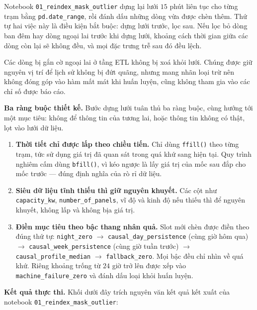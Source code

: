 \documentclass[12pt, a4paper]{report}
\begin{document}
Notebook \texttt{01\_reindex\_mask\_outlier} dựng lại lưới $15$ phút liên tục cho từng trạm
bằng \texttt{pd.date\_range}, rồi đánh dấu những dòng vừa được chèn thêm. Thứ tự hai
việc này là điều kiện bắt buộc: dựng lưới trước, lọc sau. Nếu lọc bỏ dòng ban
đêm hay dòng ngoại lai trước khi dựng lưới, khoảng cách thời gian giữa các dòng còn lại
sẽ không đều, và mọi đặc trưng trễ sau đó đều lệch.

Các dòng bị gắn cờ ngoại lai ở tầng ETL không bị xoá khỏi lưới. Chúng được giữ nguyên
vị trí để lịch sử không bị đứt quãng, nhưng mang nhãn loại trừ nên không đóng góp vào
hàm mất mát khi huấn luyện, cũng không tham gia vào các chỉ số được báo cáo.

\textbf{Ba ràng buộc thiết kế.} Bước dựng lưới tuân thủ ba ràng buộc, cùng hướng tới một
mục tiêu: không để thông tin của tương lai, hoặc thông tin không có thật, lọt vào lưới dữ liệu.

\begin{enumerate}
    \item \textbf{Thời tiết chỉ được lấp theo chiều tiến.} Chỉ dùng \texttt{ffill()} theo
    từng trạm, tức sử dụng giá trị đã quan sát trong quá khứ sang hiện tại. Quy trình nghiêm cấm
    dùng \texttt{bfill()}, vì kéo ngược là lấy giá trị của mốc sau đắp cho mốc trước --- đúng
    định nghĩa của rò rỉ dữ liệu.
    \item \textbf{Siêu dữ liệu tĩnh thiếu thì giữ nguyên khuyết.} Các cột như
    \texttt{capacity\_kw}, \texttt{number\_of\_panels}, vĩ độ và kinh độ nếu thiếu thì để nguyên
    khuyết, không lấp và không bịa giá trị.
    \item \textbf{Điền mục tiêu theo bậc thang nhân quả.} Slot mới chèn được điền theo đúng
    thứ tự: \texttt{night\_zero} $\rightarrow$ \texttt{causal\_day\_persistence} (cùng giờ hôm qua)
    $\rightarrow$ \texttt{causal\_week\_persistence} (cùng giờ tuần trước) $\rightarrow$
    \texttt{causal\_profile\_median} $\rightarrow$ \texttt{fallback\_zero}. Mọi bậc đều chỉ nhìn về
    quá khứ. Riêng khoảng trống từ $24$ giờ trở lên được xếp vào \texttt{machine\_failure\_zero}
    và đánh dấu loại khỏi huấn luyện.
\end{enumerate}

\textbf{Kết quả thực thi.} Khối dưới đây trích nguyên văn kết quả kết xuất của notebook
\texttt{01\_reindex\_mask\_outlier}:
\end{document}
